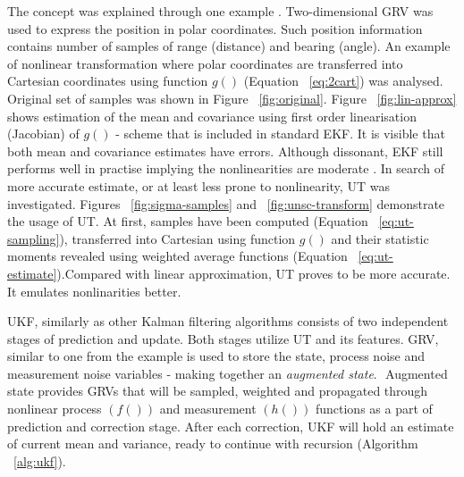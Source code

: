 The concept was explained through one example \cite{ristic04}. Two-dimensional GRV was used to express the position in polar coordinates. Such position information contains number of samples of range (distance) and bearing (angle). An example of nonlinear transformation where polar coordinates are transferred into Cartesian coordinates using function $g()$ (Equation ~\ref{eq:2cart}) was analysed. Original set of samples was shown in Figure ~\ref{fig:original}. Figure ~\ref{fig:lin-approx} shows estimation of the mean and covariance using first order linearisation (Jacobian) of $g()$ - scheme that is included in standard EKF. It is visible that both mean and covariance estimates have errors. Although dissonant, EKF still performs well in practise implying the nonlinearities are moderate \cite{ristic04}. In search of more accurate estimate, or at least less prone to nonlinearity, UT was investigated. Figures ~\ref{fig:sigma-samples} and ~\ref{fig:unsc-transform} demonstrate the usage of UT. At first, samples have been computed (Equation ~\ref{eq:ut-sampling}), transferred into Cartesian using function $g()$ and their statistic moments revealed using weighted average functions (Equation ~\ref{eq:ut-estimate}).Compared with linear approximation, UT proves to be more accurate. It emulates nonlinarities better.

UKF, similarly as other Kalman filtering algorithms consists of two independent stages of prediction and update. Both stages utilize UT and its features. GRV, similar to one from the example is used to store the state, process noise and measurement noise variables - making together an \textit{augmented state}.
$ $
Augmented state provides GRVs that will be sampled, weighted and propagated through nonlinear process $(f())$ and measurement $(h())$ functions as a part of prediction and correction stage. After each correction, UKF will hold an estimate of current mean and variance, ready to continue with recursion (Algorithm ~\ref{alg:ukf}).   

